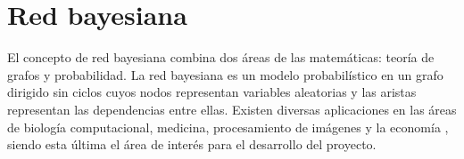 \documentclass[12pt,letterpaper]{article}
\begin{document}
\section{Red bayesiana}
El concepto de red bayesiana \cite{network} combina dos áreas de las matemáticas: teoría de grafos y probabilidad. La red bayesiana es un modelo probabilístico en un grafo dirigido sin ciclos cuyos nodos representan variables aleatorias y las aristas representan las dependencias entre ellas. Existen diversas aplicaciones en las áreas de biología computacional, medicina, procesamiento de imágenes y la economía \cite{bnet}, siendo esta última el área de interés para el desarrollo del proyecto.


\end{document}

